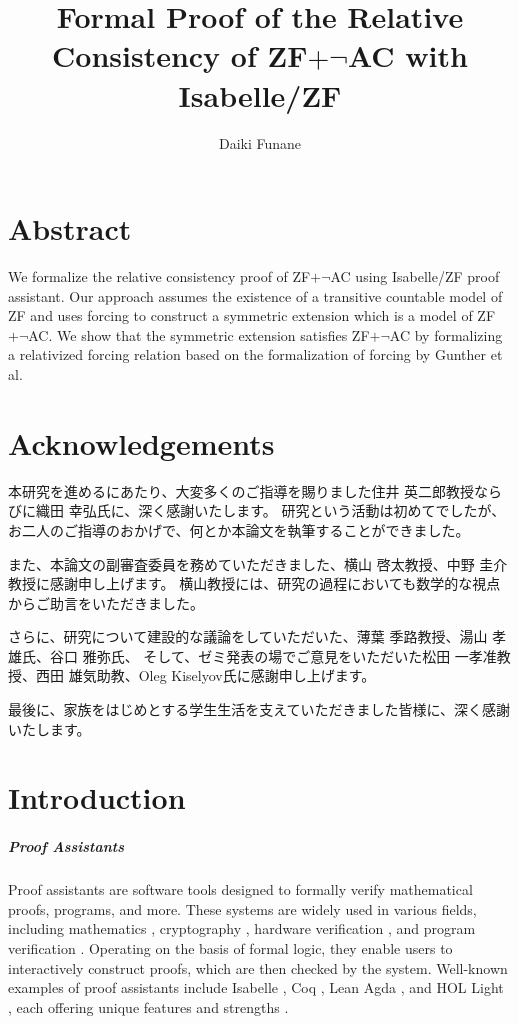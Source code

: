 \documentclass{report}
\title{Formal Proof of the Relative Consistency of ZF$+\neg$AC with Isabelle/ZF}
\author{Daiki Funane}
\affil{Graduate School of Information Sciences, Tohoku University \\
(Draft of Master's Thesis)}
\begin{document}
\maketitle

\chapter*{Abstract}
We formalize the relative consistency proof of ZF$+\neg$AC using Isabelle/ZF proof assistant.
Our approach assumes the existence of a transitive countable model of ZF and uses forcing to construct a symmetric extension which is a model of ZF$+\neg$AC.
We show that the symmetric extension satisfies ZF$+\neg$AC by formalizing a relativized forcing relation based on the formalization of forcing by Gunther et al.

\chapter*{Acknowledgements}
本研究を進めるにあたり、大変多くのご指導を賜りました住井 英二郎教授ならびに織田 幸弘氏に、深く感謝いたします。
研究という活動は初めてでしたが、お二人のご指導のおかげで、何とか本論文を執筆することができました。

また、本論文の副審査委員を務めていただきました、横山 啓太教授、中野 圭介教授に感謝申し上げます。
横山教授には、研究の過程においても数学的な視点からご助言をいただきました。

さらに、研究について建設的な議論をしていただいた、薄葉 季路教授、湯山 孝雄氏、谷口 雅弥氏、
そして、ゼミ発表の場でご意見をいただいた松田 一孝准教授、西田 雄気助教、Oleg Kiselyov氏に感謝申し上げます。

最後に、家族をはじめとする学生生活を支えていただきました皆様に、深く感謝いたします。

\clearpage
\tableofcontents
\clearpage




\chapter{Introduction}

\paragraph{Proof Assistants}
 
Proof assistants are software tools designed to formally verify mathematical proofs, programs, and more. 
These systems are widely used in various fields, including mathematics \cite{four_color,kepler}, cryptography \cite{EasyCrypt_AWS,EasyCrypt_zero_knowledge}, 
hardware verification \cite{Coq_hardware_verification,Coq_hardware_verification_2},
and program verification \cite{survey_proof_assistants_program_verification}. 
Operating on the basis of formal logic, they enable users to interactively construct proofs, which are then checked by the system.
Well-known examples of proof assistants include Isabelle \cite{isabelle_toppage}, Coq \cite{coq_toppage}, Lean \cite{lean_toppage} Agda \cite{agda_toppage}, and HOL Light \cite{hol_light_toppage},
each offering unique features and strengths \cite{survey_theorem_provers}.
\end{document}
